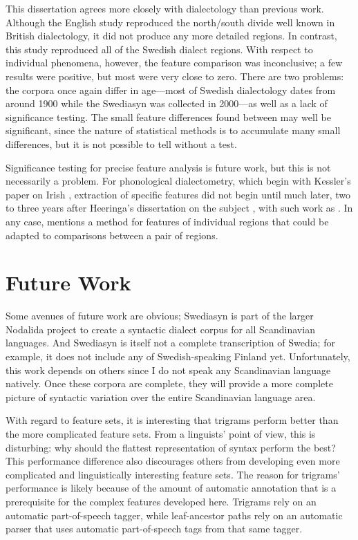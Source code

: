 This dissertation agrees more closely with dialectology than previous
work. Although the English study reproduced the north/south divide
well known in British dialectology, it did not produce any more
detailed regions. In contrast, this study reproduced all of the
Swedish dialect regions. With respect to individual phenomena,
however, the feature comparison was inconclusive; a few results were
positive, but most were very close to zero. There are two problems: the
corpora once again differ in age---most of Swedish dialectology dates
from around 1900 while the Swediasyn was collected in 2000---as well as a
lack of significance testing. The small feature differences found
between may well be significant, since the nature of statistical
methods is to accumulate many small differences, but it is not
possible to tell without a test.

Significance testing for precise feature analysis is future work, but
this is not necessarily a problem. For phonological dialectometry,
which begin with Kessler's paper on Irish \cite{kessler95}, extraction
of specific features did not begin until much later, two to three
years after Heeringa's dissertation on the subject \cite{heeringa04},
with such work as .
In any case,  mentions a method for features of
individual regions that could be adapted to comparisons between a pair
of regions.

\section{Future Work}

Some avenues of future work are obvious; Swediasyn is part of the
larger Nodalida project to create a syntactic dialect corpus for all
Scandinavian languages. And Swediasyn is itself not a complete
transcription of Swedia; for example, it does not include any of
Swedish-speaking Finland yet. Unfortunately, this work depends on
others since I do not speak any Scandinavian language natively. Once
these corpora are complete, they will provide a more complete picture
of syntactic variation over the entire Scandinavian language area.

With regard to feature sets, it is interesting that trigrams perform better
than the more complicated feature sets. From a linguists' point of
view, this is disturbing: why should the flattest representation of
syntax perform the best? This performance difference also
discourages others from developing even more complicated and
linguistically interesting feature sets. The reason for trigrams'
performance is likely because of the amount of automatic annotation
that is a prerequisite for the complex features developed
here. Trigrams rely on an automatic part-of-speech tagger, while
leaf-ancestor paths rely on an automatic parser that uses automatic
part-of-speech tags from that same tagger.


